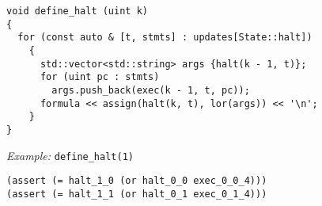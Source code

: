 \begin{lstlisting}[style=c++]
void define_halt (uint k)
{
  for (const auto & [t, stmts] : updates[State::halt])
    {
      std::vector<std::string> args {halt(k - 1, t)};
      for (uint pc : stmts)
        args.push_back(exec(k - 1, t, pc));
      formula << assign(halt(k, t), lor(args)) << '\n';
    }
}
\end{lstlisting}

\noindent
\emph{Example:} \lstinline[style=c++]{define_halt(1)}

\begin{lstlisting}[language=SMTLib]
(assert (= halt_1_0 (or halt_0_0 exec_0_0_4)))
(assert (= halt_1_1 (or halt_0_1 exec_0_1_4)))
\end{lstlisting}


